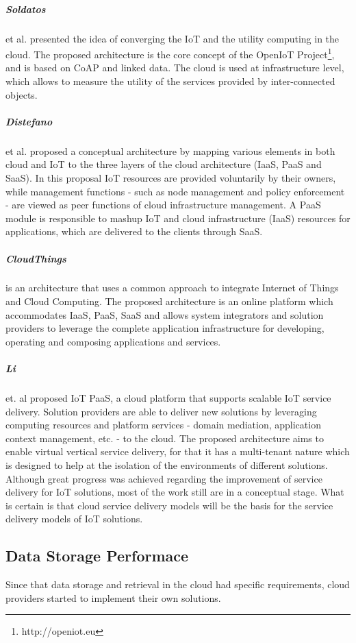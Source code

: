 \subparagraph{Soldatos} et al. \cite{soldatos2012convergence} presented the idea of converging the IoT
and the utility computing in the cloud. The proposed architecture is the core concept of the OpenIoT
Project\footnote{http://openiot.eu}, and is based on CoAP \cite{shelby2014constrained} and linked data.
The cloud is used at infrastructure level, which allows to measure the utility of the services provided
by inter-connected objects.
\subparagraph{Distefano} et al. \cite{distefano2012enabling} proposed a conceptual architecture by
mapping various elements in both cloud and IoT to the three layers of the cloud architecture (\gls{IaaS},
\gls{PaaS} and \gls{SaaS}). In this proposal IoT resources are provided voluntarily by their owners,
while management functions - such as node management and policy enforcement - are viewed as peer
functions of cloud infrastructure management. A \gls{PaaS} module is responsible to mashup IoT and
cloud infrastructure (\gls{IaaS}) resources for applications, which are delivered to the clients
through \gls{SaaS}.
\subparagraph{CloudThings} \cite{zhou2013cloudthings} is an architecture that uses a common
approach to integrate Internet of Things and Cloud Computing. The proposed architecture is an online
platform which accommodates \gls{IaaS}, \gls{PaaS}, \gls{SaaS} and allows system integrators and
solution providers to leverage the complete application infrastructure for developing, operating
and composing applications and services.
\subparagraph{Li} et. al \cite{li2013efficient} proposed IoT PaaS, a cloud platform that supports
scalable IoT service delivery. Solution providers are able to deliver new solutions by leveraging
computing resources and platform services - domain mediation, application context management, etc.
- to the cloud. The proposed architecture aims to enable virtual vertical service delivery, for that
it has a multi-tenant nature which is designed to help at the isolation of the environments of
different solutions.\\

Although great progress was achieved regarding the improvement of service delivery for \gls{IoT}
solutions, most of the work still are in a conceptual stage. What is certain is that cloud service
delivery models will be the basis for the service delivery models of \gls{IoT} solutions.

\subsection{Data Storage Performace}
\label{sub:data_storage}
Since that data storage and retrieval in the cloud had specific requirements, cloud providers started
to implement their own solutions.

